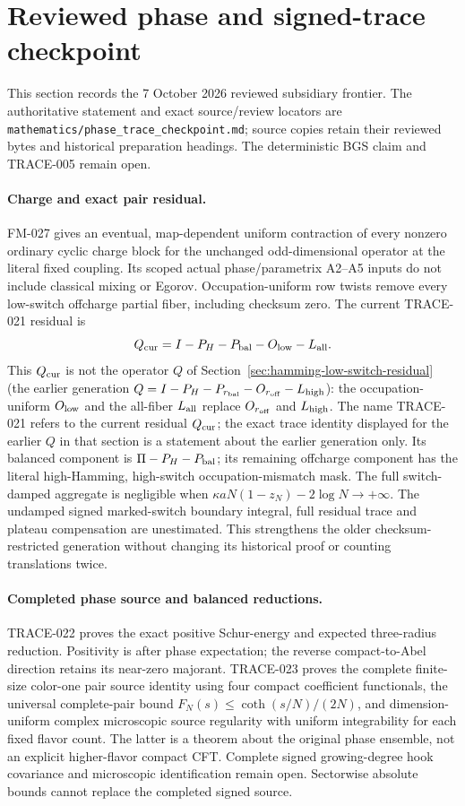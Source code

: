 \section{Reviewed phase and signed-trace checkpoint}
\label{sec:checked-phase-trace-checkpoint}

This section records the 7 October 2026 reviewed subsidiary frontier.
The authoritative statement and exact source/review locators are
\texttt{mathematics/phase\_trace\_checkpoint.md}; source copies retain their
reviewed bytes and historical preparation headings. The deterministic
BGS claim and TRACE-005 remain open.

\paragraph{Charge and exact pair residual.}
FM-027 gives an eventual, map-dependent uniform contraction of every
nonzero ordinary cyclic charge block for the unchanged odd-dimensional
operator at the literal fixed coupling. Its scoped actual phase/parametrix
A2--A5 inputs do not include classical mixing or Egorov. Occupation-uniform
row twists remove every low-switch offcharge partial fiber, including
checksum zero. The current TRACE-021 residual is
\[
 Q_{\rm cur}=I-P_H-P_{\rm bal}-O_{\rm low}-L_{\rm all}.
\]
This $Q_{\rm cur}$ is not the operator $Q$ of
Section~\ref{sec:hamming-low-switch-residual} (the earlier generation
$Q=I-P_H-P_{r_{\rm bal}}-O_{r_{\rm off}}-L_{\rm high}$): the
occupation-uniform $O_{\rm low}$ and the all-fiber $L_{\rm all}$ replace
$O_{r_{\rm off}}$ and $L_{\rm high}$. The name TRACE-021 refers to the
current residual $Q_{\rm cur}$; the exact trace identity displayed for
the earlier $Q$ in that section is a statement about the earlier
generation only.
Its balanced component is $\Pi-P_H-P_{\rm bal}$; its remaining offcharge
component has the literal high-Hamming, high-switch occupation-mismatch
mask. The full switch-damped aggregate is negligible when
$\kappa aN(1-z_N)-2\log N\to+\infty$. The undamped signed marked-switch
boundary integral, full residual trace and plateau compensation are
unestimated. This strengthens the older checksum-restricted generation
without changing its historical proof or counting translations twice.

\paragraph{Completed phase source and balanced reductions.}
TRACE-022 proves the exact positive Schur-energy and expected three-radius
reduction. Positivity is after phase expectation; the reverse
compact-to-Abel direction retains its near-zero majorant.
TRACE-023 proves the complete finite-size color-one pair source identity
using four compact coefficient functionals, the universal complete-pair
bound $F_N(s)\le\coth(s/N)/(2N)$, and dimension-uniform complex microscopic
source regularity with uniform integrability for each fixed flavor count.
The latter is a theorem about the original phase ensemble, not an explicit
higher-flavor compact CFT. Complete signed growing-degree hook covariance
and microscopic identification remain open. Sectorwise absolute bounds
cannot replace the completed signed source.

